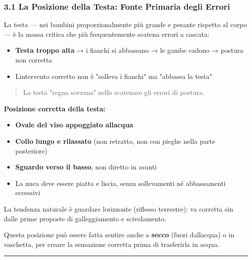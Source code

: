 \documentclass[a4paper,11pt]{article}
\providecommand{\tightlist}{%
  \setlength{\itemsep}{0pt}\setlength{\parskip}{0pt}}
\begin{document}
\subsubsection{3.1 La Posizione della Testa: Fonte Primaria degli
      Errori}\label{la-posizione-della-testa-fonte-primaria-degli-errori}

La testa --- nei bambini proporzionalmente più grande e pesante rispetto
al corpo --- è la massa critica che più frequentemente scatena errori a
cascata:

\begin{itemize}
      \tightlist
      \item
            \textbf{Testa troppo alta} → i fianchi si abbassano → le gambe cadono
            → postura non corretta
      \item
            L\textquotesingle intervento corretto non è "solleva i fianchi" ma
            "abbassa la testa"
\end{itemize}

\begin{quote}
      La testa "regna sovrana" nello scatenare gli errori di postura.
\end{quote}

\textbf{Posizione corretta della testa:}

\begin{itemize}
      \tightlist
      \item
            \textbf{Ovale del viso appoggiato all\textquotesingle acqua}
      \item
            \textbf{Collo lungo e rilassato} (non retratto, non con pieghe nella
            parte posteriore)
      \item
            \textbf{Sguardo verso il basso}, non diretto in avanti
      \item
            La nuca deve essere piatta e liscia, senza sollevamenti né
            abbassamenti eccessivi
\end{itemize}

La tendenza naturale è guardare l\textquotesingle orizzonte (riflesso
terrestre): va corretta sin dalle prime proposte di galleggiamento e
scivolamento.

Questa posizione può essere fatta sentire anche a \textbf{secco} (fuori
dall\textquotesingle acqua) o in vaschetta, per creare la sensazione
corretta prima di trasferirla in acqua.

\begin{center}\rule{0.5\linewidth}{0.5pt}\end{center}
\end{document}
